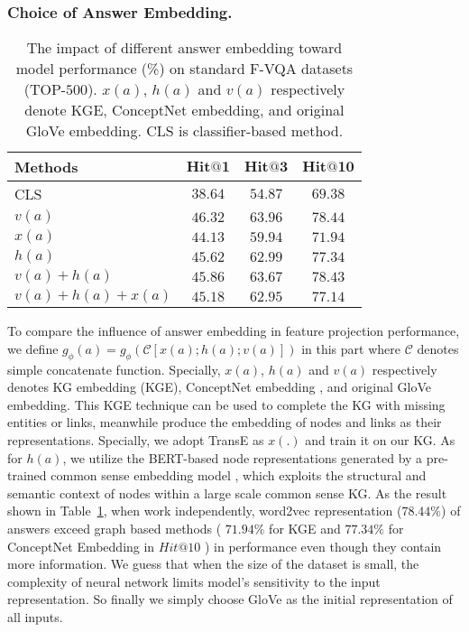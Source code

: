 \documentclass[runningheads]{llncs}
\begin{document}
\subsubsection{Choice of Answer Embedding.}
\setlength{\tabcolsep}{8pt}
\begin{table}[htbp]
\scriptsize
\caption{The impact of different answer embedding toward model performance (\%) on standard F-VQA datasets (TOP-$500$). $x(a)$, $h(a)$ and $v(a)$ respectively denote KGE,  ConceptNet embedding, and original GloVe embedding. CLS is classifier-based method.}
\label{tab:Answer Embedding Ablation}
\centering
\begin{tabular}{l|ccc}
 \toprule
\multirow{1}{*}{{\bf \quad   Methods }}                        
& {\bf $\bm{Hit@1}$}
& $\bm{Hit@3}$
& $\bm{Hit@10}$
\\ 
 \midrule
\quad CLS & $38.64$  & $54.87$   & $69.38$   \\			 	
\quad $v(a)$ & $\bm{46.32}$  & $\bm{63.96}$   & $\bm{78.44}$   \\			 	
\quad $x(a)$ & $44.13$  & $59.94$   & $71.94$   \\ 			 	
\quad $h(a)$ & $45.62$  & $62.99$   & $77.34$   \\ 	
\quad $v(a) + h(a)$ & $45.86$  & $63.67$   & $78.43$   \\ 			 	
\quad $v(a) + h(a) + x(a)$ & $45.18$  & $62.95$   & $77.14$   \\ 			 	
\bottomrule 
\end{tabular}
\end{table}
To compare the influence of answer embedding in feature projection performance, we define $g_{\phi}(a)=g_{\phi}(\mathcal{C}[x(a);h(a);v(a)])$ in this part where $\mathcal{C}$ denotes simple concatenate function. Specially, $x(a)$, $h(a)$ and $v(a)$ respectively denotes KG embedding (KGE),  ConceptNet embedding \cite{DBLP:conf/aaai/MalaviyaBBC20}, and original GloVe embedding. 
This KGE technique can be used to complete the KG with missing entities or links, meanwhile produce the embedding of nodes and links as their representations. 
Specially, we adopt TransE \cite{DBLP:conf/nips/BordesUGWY13} as $x(.)$ and train it on our KG. 
As for $h(a)$, we utilize the BERT-based node representations generated by a pre-trained common sense embedding model \cite{DBLP:conf/aaai/MalaviyaBBC20}, which exploits the structural and semantic context of nodes within a large scale common sense KG.
As the result shown in Table~\ref{tab:Answer Embedding Ablation}, when work independently, word2vec representation ($78.44\%$) of answers exceed graph based methods ( $71.94\%$ for KGE and $77.34\%$ for ConceptNet Embedding in $Hit@10$ ) in performance even though they contain more information. 
We guess that when the size of the dataset is small, the complexity of neural network limits model's sensitivity to the input representation. So finally we simply choose GloVe as the initial representation of all inputs.
\end{document}

